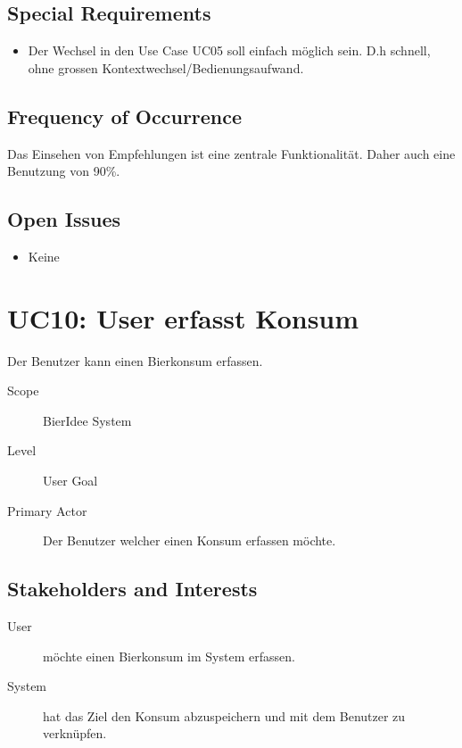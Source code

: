 \documentclass[10pt,a4paper]{scrartcl}
\begin{document}
\subsection*{Special Requirements}

\begin{itemize}
\item Der Wechsel in den Use Case UC05 soll einfach möglich sein. D.h schnell, ohne grossen Kontextwechsel/Bedienungsaufwand.
\end{itemize}



\subsection*{Frequency of Occurrence}

Das Einsehen von Empfehlungen ist eine zentrale Funktionalität. Daher auch eine Benutzung von 90\%.

\subsection*{Open Issues}

\begin{itemize}
\item Keine
\end{itemize}


\section*{UC10: User erfasst Konsum}
Der Benutzer kann einen Bierkonsum erfassen.

\begin{description}
\item[Scope] BierIdee System
\item[Level] User Goal
\item[Primary Actor] Der Benutzer welcher einen Konsum erfassen möchte.
\end{description}


\subsection*{Stakeholders and Interests}

\begin{description}
\item[User] möchte einen Bierkonsum im System erfassen.
\item[System] hat das Ziel den Konsum abzuspeichern und mit dem Benutzer zu verknüpfen.
\end{description}
\end{document}
